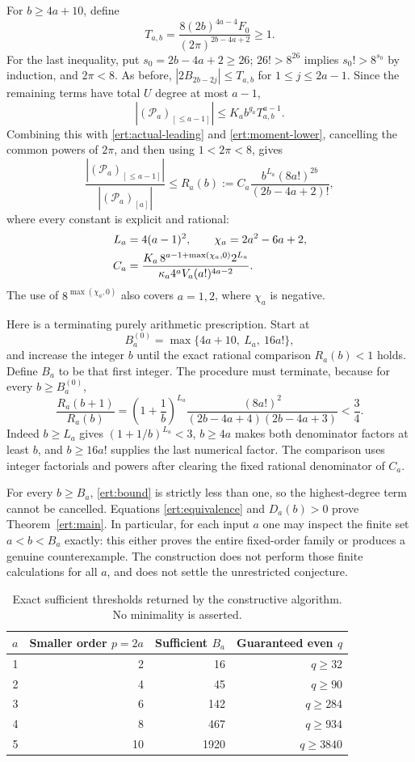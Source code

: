 \documentclass[11pt,a4paper]{article}
\numberwithin{equation}{section}
\theoremstyle{plain}
\theoremstyle{definition}
\theoremstyle{remark}
\begin{document}
For $b\ge4a+10$, define
\[
 T_{a,b}=\frac{8(2b)^{4a-4}F_0}{(2\pi)^{2b-4a+2}}\ge1.
\]
For the last inequality, put $s_0=2b-4a+2\ge26$;
$26!>8^{26}$ implies $s_0!>8^{s_0}$ by induction,
and $2\pi<8$.
As before, $|2B_{2b-2j}|\le T_{a,b}$ for $1\le j\le2a-1$.
Since the remaining terms have total $U$ degree at most $a-1$,
\[
 |(\mathscr P_a)_{[\le a-1]}|
      \le K_a b^{g_a}T_{a,b}^{a-1}.
\]
Combining this with \eqref{ert:actual-leading} and
\eqref{ert:moment-lower}, cancelling the common powers of $2\pi$,
and then using $1<2\pi<8$, gives
\begin{equation}\label{ert:bound}
 \frac{|(\mathscr P_a)_{[\le a-1]}|}{|(\mathscr P_a)_{[a]}|}
 \le R_a(b):=C_a\frac{b^{L_a}(8a!)^{2b}}{(2b-4a+2)!},
\end{equation}
where every constant is explicit and rational:
\begin{align}
 L_a&=4(a-1)^2,\qquad \chi_a=2a^2-6a+2,\notag\\
 C_a&=\frac{K_a\,8^{a-1+\max(\chi_a,0)}2^{L_a}}
 {\kappa_a4^aV_a(a!)^{4a-2}}.
 \label{ert:constant}
\end{align}
The use of $8^{\max(\chi_a,0)}$ also covers $a=1,2$, where
$\chi_a$ is negative.

Here is a terminating purely arithmetic prescription. Start at
\[
 B_a^{(0)}=\max\{4a+10,\ L_a,\ 16a!\},
\]
and increase the integer $b$ until the exact rational comparison
$R_a(b)<1$ holds. Define $B_a$ to be that first integer. The procedure
must terminate, because for every $b\ge B_a^{(0)}$,
\[
 \frac{R_a(b+1)}{R_a(b)}
 =\left(1+\frac1b\right)^{L_a}
 \frac{(8a!)^2}{(2b-4a+4)(2b-4a+3)}<\frac34.
\]
Indeed $b\ge L_a$ gives $(1+1/b)^{L_a}<3$,
$b\ge4a$ makes both denominator factors at least $b$, and
$b\ge16a!$ supplies the last numerical factor.
The comparison uses integer factorials and powers after clearing
the fixed rational denominator of $C_a$.

For every $b\ge B_a$, \eqref{ert:bound} is strictly less than one,
so the highest-degree term cannot be cancelled. Equations
\eqref{ert:equivalence} and $D_a(b)>0$ prove
Theorem~\ref{ert:main}. In particular, for each input $a$ one may
inspect the finite set $a<b<B_a$ exactly: this either proves the
entire fixed-order family or produces a genuine counterexample.
The construction does not perform those finite calculations for all
$a$, and does not settle the unrestricted conjecture.

\begin{table}[htbp]
\centering
\begin{tabular}{rrrr}
\toprule
$a$ & Smaller order $p=2a$ & Sufficient $B_a$ & Guaranteed even $q$ \\
\midrule
1 & 2  & 16   & $q\ge32$ \\
2 & 4  & 45   & $q\ge90$ \\
3 & 6  & 142  & $q\ge284$ \\
4 & 8  & 467  & $q\ge934$ \\
5 & 10 & 1920 & $q\ge3840$ \\
\bottomrule
\end{tabular}
\caption{Exact sufficient thresholds returned by the constructive
algorithm. No minimality is asserted.}
\label{ert:threshold-table}
\end{table}
\end{document}
